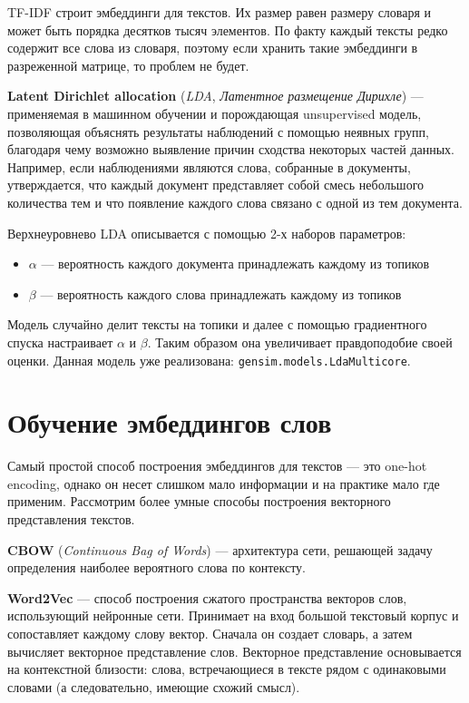TF-IDF строит эмбеддинги для текстов. Их размер равен размеру словаря и может быть порядка десятков тысяч элементов. По факту каждый тексты редко содержит все слова из словаря, поэтому если хранить такие эмбеддинги в разреженной матрице, то проблем не будет.

\begin{definition}
     \textbf{Latent Dirichlet allocation} (\textit{LDA}, \textit{Латентное размещение Дирихле}) --- применяемая в машинном обучении и порождающая unsupervised модель, позволяющая объяснять результаты наблюдений с помощью неявных групп, благодаря чему возможно выявление причин сходства некоторых частей данных. Например, если наблюдениями являются слова, собранные в документы, утверждается, что каждый документ представляет собой смесь небольшого количества тем и что появление каждого слова связано с одной из тем документа.
\end{definition}

Верхнеуровнево LDA описывается с помощью 2-х наборов параметров:
\begin{itemize}
    \item $\alpha$ --- вероятность каждого документа принадлежать каждому из топиков
    \item $\beta$ --- вероятность каждого слова принадлежать каждому из топиков
\end{itemize}

Модель случайно делит тексты на топики и далее с помощью градиентного спуска настраивает $\alpha$ и $\beta$. Таким образом она увеличивает правдоподобие своей оценки. Данная модель уже реализована: \texttt{gensim.models.LdaMulticore}.

\section{Обучение эмбеддингов слов}

Самый простой способ построения эмбеддингов для текстов --- это one-hot encoding, однако он несет слишком мало информации и на практике мало где применим. Рассмотрим более умные способы построения векторного представления текстов.

\begin{definition}
    \textbf{CBOW} (\textit{Continuous Bag of Words}) --- архитектура сети, решающей задачу определения наиболее вероятного слова по контексту.
\end{definition}

\begin{definition}
    \textbf{Word2Vec} — способ построения сжатого пространства векторов слов, использующий нейронные сети. Принимает на вход большой текстовый корпус и сопоставляет каждому слову вектор. Сначала он создает словарь, а затем вычисляет векторное представление слов. Векторное представление основывается на контекстной близости: слова, встречающиеся в тексте рядом с одинаковыми словами (а следовательно, имеющие схожий смысл).
\end{definition}

